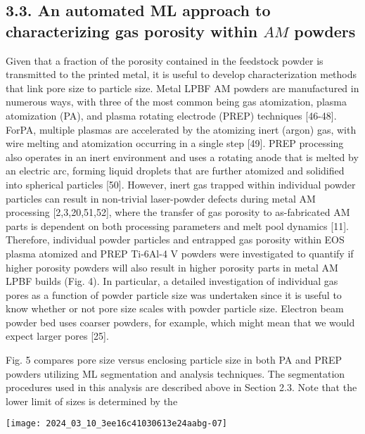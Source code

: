\documentclass[10pt]{article}
\begin{document}
\subsection*{3.3. An automated ML approach to characterizing gas porosity within $A M$ powders}
Given that a fraction of the porosity contained in the feedstock powder is transmitted to the printed metal, it is useful to develop characterization methods that link pore size to particle size. Metal LPBF AM powders are manufactured in numerous ways, with three of the most common being gas atomization, plasma atomization (PA), and plasma rotating electrode (PREP) techniques [46-48]. ForPA, multiple plasmas are accelerated by the atomizing inert (argon) gas, with wire melting and atomization occurring in a single step [49]. PREP processing also operates in an inert environment and uses a rotating anode that is melted by an electric arc, forming liquid droplets that are further atomized and solidified into spherical particles [50]. However, inert gas trapped within individual powder particles can result in non-trivial laser-powder defects during metal AM processing [2,3,20,51,52], where the transfer of gas porosity to as-fabricated AM parts is dependent on both processing parameters and melt pool dynamics [11]. Therefore, individual powder particles and entrapped gas porosity within EOS plasma atomized and PREP Ti-6Al-4 V powders were investigated to quantify if higher porosity powders will also result in higher porosity parts in metal AM LPBF builds (Fig. 4). In particular, a detailed investigation of individual gas pores as a function of powder particle size was undertaken since it is useful to know whether or not pore size scales with powder particle size. Electron beam powder bed uses coarser powders, for example, which might mean that we would expect larger pores [25].

Fig. 5 compares pore size versus enclosing particle size in both PA and PREP powders utilizing ML segmentation and analysis techniques. The segmentation procedures used in this analysis are described above in Section 2.3. Note that the lower limit of sizes is determined by the

\begin{center}
\texttt{[image: 2024\_03\_10\_3ee16c41030613e24aabg-07]}
\end{center}
\end{document}
